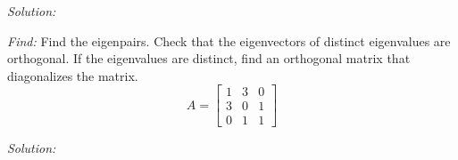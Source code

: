\documentclass[11pt]{homework}
\begin{document}
\emph{Solution:}
\newline


\question
\emph{Find:}
\newline
Find the eigenpairs.
Check that the eigenvectors of distinct eigenvalues are orthogonal.
If the eigenvalues are distinct, find an orthogonal matrix that diagonalizes the matrix.
\begin{equation*}
A = 
  \begin{bmatrix}
  1 & 3 & 0 \\
  3 & 0 & 1 \\
  0 & 1 & 1
  \end{bmatrix}
\end{equation*}

\emph{Solution:}
\newline
\end{document}
